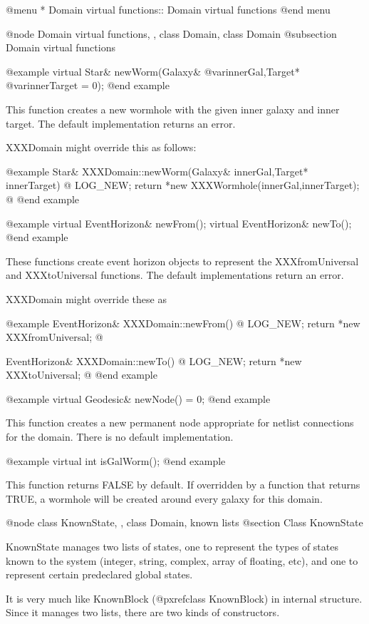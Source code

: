 @menu
* Domain virtual functions::    Domain virtual functions
@end menu

@node Domain virtual functions,  , class Domain, class Domain
@subsection Domain virtual functions

@example
virtual Star& newWorm(Galaxy& @var{innerGal},Target* @var{innerTarget} = 0);
@end example

This function creates a new wormhole with the given inner galaxy and
inner target.  The default implementation returns an error.

XXXDomain might override this as follows:

@example
Star& XXXDomain::newWorm(Galaxy& innerGal,Target* innerTarget)  @{
        LOG_NEW; return *new XXXWormhole(innerGal,innerTarget);
@}
@end example

@example
virtual EventHorizon& newFrom();
virtual EventHorizon& newTo();
@end example

These functions create event horizon objects to represent the
XXXfromUniversal and XXXtoUniversal functions.  The default
implementations return an error.

XXXDomain might override these as

@example
EventHorizon& XXXDomain::newFrom() @{
    LOG_NEW; return *new XXXfromUniversal;
@}

EventHorizon& XXXDomain::newTo() @{
    LOG_NEW; return *new XXXtoUniversal;
@}
@end example

@example
virtual Geodesic& newNode() = 0;
@end example

This function creates a new permanent node appropriate for netlist
connections for the domain.  There is no default implementation.

@example
virtual int isGalWorm();
@end example

This function returns FALSE by default.  If overridden by a function
that returns TRUE, a wormhole will be created around every galaxy
for this domain.

@node class KnownState,  , class Domain, known lists
@section Class KnownState

KnownState manages two lists of states, one to represent the types of
states known to the system (integer, string, complex, array of floating,
etc), and one to represent certain predeclared global states.

It is very much like KnownBlock (@pxref{class KnownBlock})
in internal structure.  Since it manages
two lists, there are two kinds of constructors.


